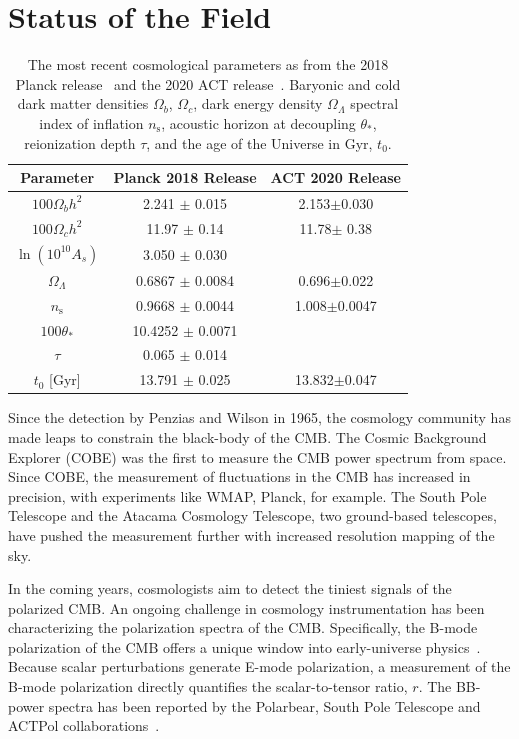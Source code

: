 \section{Status of the Field}
\begin{table}[b!]
    \centering
    \begin{tabular}{|c|c|c|}\hline 
         Parameter & Planck 2018 Release & ACT 2020 Release \\ \hline
         $100\Omega_b h^2$ &  2.241 $\pm$ 0.015 &2.153$\pm$0.030 \\
         $100\Omega_c h^2$ & 11.97 $\pm$ 0.14 & 11.78$\pm$ 0.38\\
         $\ln(10^{10}A_s)$ &  3.050 $\pm$ 0.030 & \\
         $\Omega_\Lambda$ & 0.6867 $\pm$ 0.0084 & 0.696$\pm$0.022\\
         $n_{\text{s}}$ & 0.9668 $\pm$ 0.0044 & 1.008$\pm$0.0047\\
         $100\theta_{*}$ & 10.4252 $\pm$ 0.0071& \\ 
         $\tau$   &0.065 $\pm$ 0.014 & \\
         $t_0$ [Gyr] & 13.791 $\pm$ 0.025 & 13.832$\pm$0.047\\
         \hline
    \end{tabular}
    \caption{The most recent cosmological parameters as from the 2018 Planck release~\cite{planck2020} and the 2020 ACT release~\cite{aiola_2020}.  Baryonic and cold dark matter densities $\Omega_b$, $\Omega_c$, dark energy density $\Omega_\Lambda$ spectral index of inflation $n_{\text{s}}$, acoustic horizon at decoupling $\theta_*$, reionization depth $\tau$, and the age of the Universe in Gyr, $t_0$.}
    \label{tab:cosmology_recent_results}
\end{table}

Since the detection by Penzias and Wilson in 1965, the cosmology community has made leaps to constrain the black-body of the CMB.  The Cosmic Background Explorer (COBE) was the first to measure the CMB power spectrum from space.  Since COBE, the measurement of fluctuations in the CMB has increased in precision, with experiments like WMAP, Planck, for example.  The South Pole Telescope and the Atacama Cosmology Telescope, two ground-based telescopes, have pushed the measurement further with increased resolution mapping of the sky.

In the coming years, cosmologists aim to detect the tiniest signals of the polarized CMB.  An ongoing challenge in cosmology instrumentation has been characterizing the polarization spectra of the CMB.  Specifically, the B-mode polarization of the CMB offers a unique window into early-universe physics~\cite{weinberg_cosmo}.  Because scalar perturbations generate E-mode polarization, a measurement of the B-mode polarization directly quantifies the scalar-to-tensor ratio, $r$.  The BB-power spectra has been reported by the Polarbear, South Pole Telescope and ACTPol collaborations~\cite{planck_data,choi_2020,PARAde_2014}.

